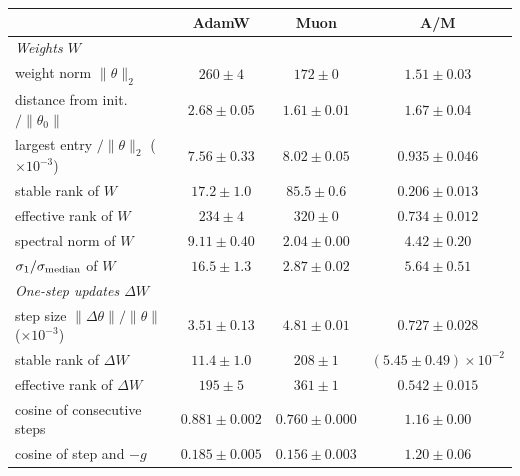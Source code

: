 \begin{center}\small\begin{minipage}{\linewidth}\centering
\captionsetup{type=table}
\caption{All metrics of Step 2 at training loss 0.65, which AdamW reaches near step 4600 and Muon near step 2000:
mean $\pm$ half-range over data orders 0--2, and the ratio AdamW/Muon. If AdamW's values range over $[a_{\min},a_{\max}]$ and Muon's over $[b_{\min},b_{\max}]$, the ratio
ranges over $[a_{\min}/b_{\max},\,a_{\max}/b_{\min}]$, given as midpoint $\pm$ half-width. Rows marked ($\times10^k$)
are in units of $10^k$. Bold: the five ratios farthest from 1 whose range excludes 1.}
\label{tab:app-am}
\footnotesize\setlength{\tabcolsep}{2.5pt}\setlength{\aboverulesep}{0pt}\setlength{\belowrulesep}{0pt}%
\renewcommand{\arraystretch}{1.15}%
\begin{tabular}{@{}l|cc|c@{}}
 & AdamW & Muon & A/M \\
\midrule
\emph{Weights $W$} & & & \\
weight norm $\|\theta\|_2$ & $260 \pm 4$ & $172 \pm 0$ & $1.51 \pm 0.03$ \\
distance from init.\ $/\|\theta_0\|$ & $2.68 \pm 0.05$ & $1.61 \pm 0.01$ & $1.67 \pm 0.04$ \\
largest entry $/\|\theta\|_2$ ($\times10^{-3}$) & $7.56 \pm 0.33$ & $8.02 \pm 0.05$ & $0.935 \pm 0.046$ \\
stable rank of $W$ & $17.2 \pm 1.0$ & $85.5 \pm 0.6$ & {\boldmath\textbf{$0.206 \pm 0.013$}} \\
effective rank of $W$ & $234 \pm 4$ & $320 \pm 0$ & $0.734 \pm 0.012$ \\
spectral norm of $W$ & $9.11 \pm 0.40$ & $2.04 \pm 0.00$ & $4.42 \pm 0.20$ \\
$\sigma_1/\sigma_{\rm median}$ of $W$ & $16.5 \pm 1.3$ & $2.87 \pm 0.02$ & {\boldmath\textbf{$5.64 \pm 0.51$}} \\
\emph{One-step updates $\Delta W$} & & & \\
step size $\|\Delta\theta\|/\|\theta\|$ ($\times10^{-3}$) & $3.51 \pm 0.13$ & $4.81 \pm 0.01$ & $0.727 \pm 0.028$ \\
stable rank of $\Delta W$ & $11.4 \pm 1.0$ & $208 \pm 1$ & {\boldmath\textbf{$(5.45 \pm 0.49){\times}10^{-2}$}} \\
effective rank of $\Delta W$ & $195 \pm 5$ & $361 \pm 1$ & $0.542 \pm 0.015$ \\
cosine of consecutive steps & $0.881 \pm 0.002$ & $0.760 \pm 0.000$ & $1.16 \pm 0.00$ \\
cosine of step and $-g$ & $0.185 \pm 0.005$ & $0.156 \pm 0.003$ & $1.20 \pm 0.06$ \\

\end{tabular}
\end{minipage}
\end{center}
